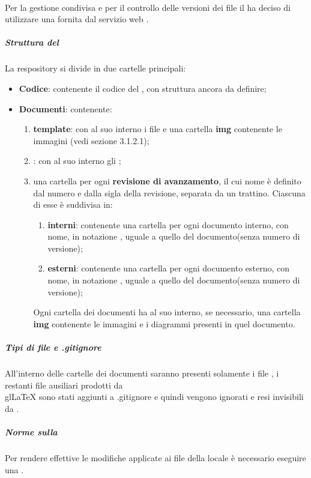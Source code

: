 	\paragraph{}
	Per la gestione condivisa e per il controllo delle versioni dei file il  ha deciso di utilizzare una  fornita dal servizio web .
		\subparagraph{Struttura del }
		La respository si divide in due cartelle principali:
		\begin{itemize}
			\item \textbf{Codice}: contenente il codice del , con struttura ancora da definire;
			\item \textbf{Documenti}: contenente:
			\begin{enumerate}
				\item \textbf{template}: con al suo interno i file  e una cartella \textbf{img} contenente le immagini (vedi sezione 3.1.2.1);
				\item \textbf{}: con al suo interno gli ;
				\item una cartella per ogni \textbf{revisione di avanzamento}, il cui nome è definito dal numero e dalla sigla della revisione, separata da un trattino. Ciascuna di esse è suddivisa in:
				\begin{enumerate}
					\item \textbf{interni}: contenente una cartella per ogni documento interno, con nome, in notazione , uguale a quello del documento(senza numero di versione);
					\item \textbf{esterni}: contenente una cartella per ogni documento esterno, con nome, in notazione , uguale a quello del documento(senza numero di versione);
				\end{enumerate}
				Ogni cartella dei documenti ha al suo interno, se necessario, una cartella \textbf{img} contenente le immagini e i diagrammi presenti in quel documento.
			\end{enumerate}
		\end{itemize}
		\subparagraph{Tipi di file e .gitignore}
		All'interno delle cartelle dei documenti saranno presenti solamente i file , i restanti file ausiliari prodotti da \\gl{LaTeX}{} sono stati aggiunti a .gitignore e quindi vengono ignorati e resi invisibili da .
		\subparagraph{Norme sulla }
		Per rendere effettive le modifiche applicate ai file della  locale è necessario eseguire una \textbf{}.
